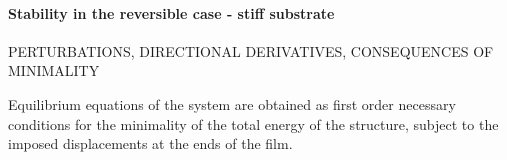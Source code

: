 \paragraph{Stability in the reversible case - stiff substrate}



PERTURBATIONS, DIRECTIONAL DERIVATIVES, CONSEQUENCES OF MINIMALITY


Equilibrium equations of the system are obtained as first order necessary conditions for the minimality of the total energy of the structure, subject to the imposed displacements at the ends of the film.

